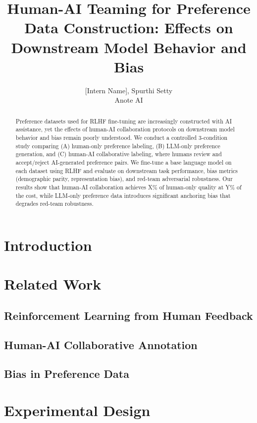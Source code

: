 \documentclass{article}
\title{Human-AI Teaming for Preference Data Construction: Effects on Downstream Model Behavior and Bias}
\author{[Intern Name], Spurthi Setty \\
Anote AI}
\date{}
\begin{document}
\maketitle

\begin{abstract}
\noindent
Preference datasets used for RLHF fine-tuning are increasingly constructed with AI assistance, yet the effects of human-AI collaboration protocols on downstream model behavior and bias remain poorly understood. We conduct a controlled 3-condition study comparing (A) human-only preference labeling, (B) LLM-only preference generation, and (C) human-AI collaborative labeling, where humans review and accept/reject AI-generated preference pairs. We fine-tune a base language model on each dataset using RLHF and evaluate on downstream task performance, bias metrics (demographic parity, representation bias), and red-team adversarial robustness. Our results show that human-AI collaboration achieves X\% of human-only quality at Y\% of the cost, while LLM-only preference data introduces significant anchoring bias that degrades red-team robustness.
\end{abstract}

\section{Introduction}

\section{Related Work}
\subsection{Reinforcement Learning from Human Feedback}
\subsection{Human-AI Collaborative Annotation}
\subsection{Bias in Preference Data}

\section{Experimental Design}
\end{document}
